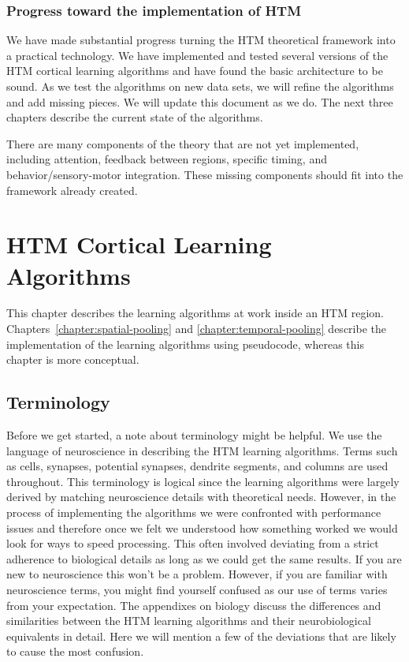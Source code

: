 \documentclass{report}
\begin{document}
\subsection*{Progress toward the implementation of HTM}

We have made substantial progress turning the HTM theoretical
framework into a practical technology. We have implemented and tested
several versions of the HTM cortical learning algorithms and have
found the basic architecture to be sound. As we test the algorithms on
new data sets, we will refine the algorithms and add missing
pieces. We will update this document as we do. The next three chapters
describe the current state of the algorithms.

There are many components of the theory that are not yet implemented,
including attention, feedback between regions, specific timing, and
behavior/sensory-motor integration. These missing components should
fit into the framework already created.

\chapter{HTM Cortical Learning Algorithms}
\label{chapter:learning}

This chapter describes the learning algorithms at work inside an HTM
region. Chapters~\ref{chapter:spatial-pooling} and
\ref{chapter:temporal-pooling} describe the implementation of the
learning algorithms using pseudocode, whereas this chapter is more
conceptual.

\section*{Terminology}

Before we get started, a note about terminology might be helpful. We
use the language of neuroscience in describing the HTM learning
algorithms. Terms such as cells, synapses, potential synapses,
dendrite segments, and columns are used throughout. This terminology
is logical since the learning algorithms were largely derived by
matching neuroscience details with theoretical needs. However, in the
process of implementing the algorithms we were confronted with
performance issues and therefore once we felt we understood how
something worked we would look for ways to speed processing. This
often involved deviating from a strict adherence to biological details
as long as we could get the same results. If you are new to
neuroscience this won't be a problem. However, if you are familiar
with neuroscience terms, you might find yourself confused as our use
of terms varies from your expectation. The appendixes on biology
discuss the differences and similarities between the HTM learning
algorithms and their neurobiological equivalents in detail. Here we
will mention a few of the deviations that are likely to cause the most
confusion.
\end{document}
